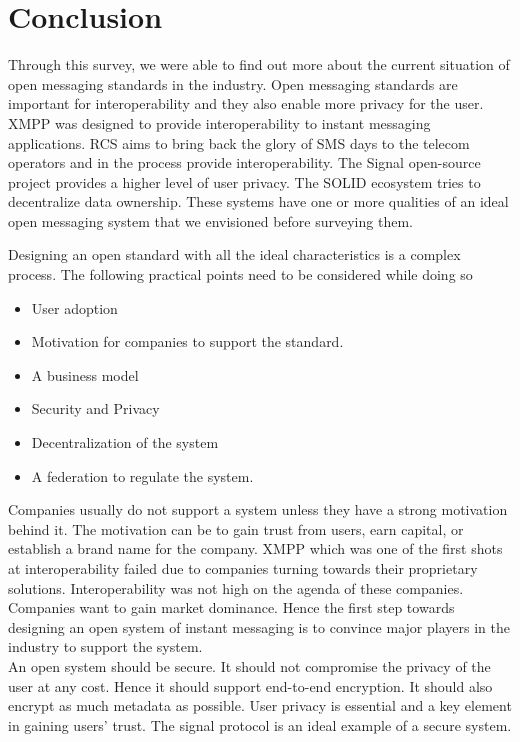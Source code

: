 \documentclass[12pt, conference, a4paper]{article}
\begin{document}
\section{Conclusion}  
\label{SEC: conclusion}
Through this survey, we were able to find out more about the current situation of open messaging standards in the industry. Open messaging standards are important for interoperability and they also enable more privacy for the user.  XMPP was designed to provide interoperability to instant messaging applications. RCS aims to bring back the glory of SMS days to the telecom operators and in the process provide interoperability. The Signal open-source project provides a higher level of user privacy. The SOLID ecosystem tries to decentralize data ownership. These systems have one or more qualities of an ideal open messaging system that we envisioned before surveying them. 
\par
Designing an open standard with all the ideal characteristics is a complex process. The following practical points need to be considered while doing so
\begin{itemize}
\item User adoption
\item Motivation for companies to support the standard. 
\item A business model
\item Security and Privacy
\item Decentralization of the system
\item A federation to regulate the system. 
\end{itemize}
\par
Companies usually do not support a system unless they have a strong motivation behind it. The motivation can be to gain trust from users, earn capital, or establish a brand name for the company. XMPP which was one of the first shots at interoperability failed due to companies turning towards their proprietary solutions. Interoperability was not high on the agenda of these companies. Companies want to gain market dominance. Hence the first step towards designing an open system of instant messaging is to convince major players in the industry to support the system. \\
An open system should be secure. It should not compromise the privacy of the user at any cost. Hence it should support end-to-end encryption. It should also encrypt as much metadata as possible. User privacy is essential and a key element in gaining users’ trust. The signal protocol is an ideal example of a secure system.  
\end{document}
